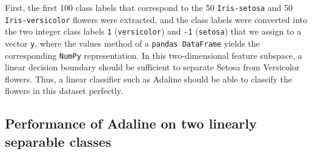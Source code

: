 \documentclass[11pt]{article}
\begin{document}
    First, the first 100 class labels that correspond to the 50 \texttt{Iris-setosa} and 50 \texttt{Iris-versicolor} flowers were extracted, and the class labels were converted into the two integer class labels \texttt{1} (\texttt{versicolor}) and \texttt{-1} (\texttt{setosa}) that we assign to a vector \texttt{y}, where the values method of a \texttt{pandas DataFrame} yields the corresponding \texttt{NumPy} representation.
    In this two-dimensional feature subspace, a linear decision boundary should be sufficient to separate Setosa from Versicolor flowers.
    Thus, a linear classifier such as Adaline should be able to classify the flowers in this dataset perfectly.

    \subsection{Performance of Adaline on two linearly separable classes} \label{subsec:ada_perf_2class}
\end{document}

